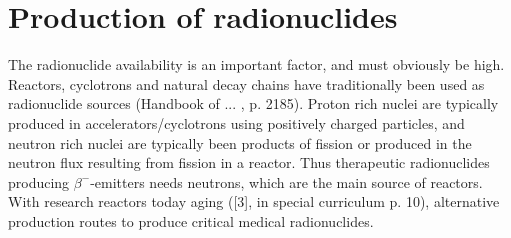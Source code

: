 \section{Production of radionuclides}

The radionuclide availability is an important factor, and must obviously be high. Reactors, cyclotrons and natural decay chains have traditionally been used as radionuclide sources (Handbook of ... , p. 2185). Proton rich nuclei are typically produced in accelerators/cyclotrons using positively charged particles, and neutron rich nuclei are typically been products of fission or produced in the neutron flux resulting from fission in a reactor. Thus therapeutic radionuclides producing $\beta^-$-emitters needs neutrons, which are the main source of reactors. With research reactors today aging ([3], in special curriculum p. 10), alternative production routes to produce critical medical radionuclides. \\

